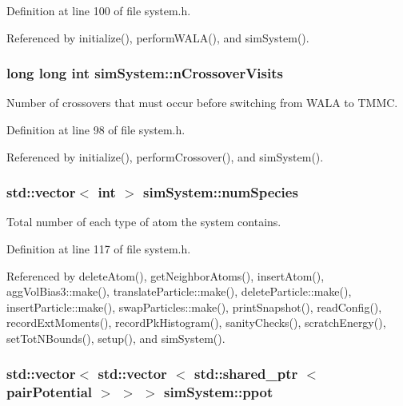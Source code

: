 Definition at line 100 of file system.\-h.



Referenced by initialize(), perform\-W\-A\-L\-A(), and sim\-System().

\hypertarget{classsim_system_aa748f651ddd9a2bf6d88bfcab9153905}{
\subsubsection[{n\-Crossover\-Visits}]{\setlength{\rightskip}{0pt plus 5cm}long long int sim\-System\-::n\-Crossover\-Visits}}\label{classsim_system_aa748f651ddd9a2bf6d88bfcab9153905}


Number of crossovers that must occur before switching from W\-A\-L\-A to T\-M\-M\-C. 



Definition at line 98 of file system.\-h.



Referenced by initialize(), perform\-Crossover(), and sim\-System().

\hypertarget{classsim_system_a9eea865e6dc1cff377b1e79c4d9c23f0}{
\subsubsection[{num\-Species}]{\setlength{\rightskip}{0pt plus 5cm}std\-::vector$<$ int $>$ sim\-System\-::num\-Species}}\label{classsim_system_a9eea865e6dc1cff377b1e79c4d9c23f0}


Total number of each type of atom the system contains. 



Definition at line 117 of file system.\-h.



Referenced by delete\-Atom(), get\-Neighbor\-Atoms(), insert\-Atom(), agg\-Vol\-Bias3\-::make(), translate\-Particle\-::make(), delete\-Particle\-::make(), insert\-Particle\-::make(), swap\-Particles\-::make(), print\-Snapshot(), read\-Config(), record\-Ext\-Moments(), record\-Pk\-Histogram(), sanity\-Checks(), scratch\-Energy(), set\-Tot\-N\-Bounds(), setup(), and sim\-System().

\hypertarget{classsim_system_ad2e290b5963f132e6a3a56cee35c8e9f}{
\subsubsection[{ppot}]{\setlength{\rightskip}{0pt plus 5cm}std\-::vector$<$ std\-::vector $<$ std\-::shared\-\_\-ptr $<$ {\bf pair\-Potential} $>$ $>$ $>$ sim\-System\-::ppot}}\label{classsim_system_ad2e290b5963f132e6a3a56cee35c8e9f}


